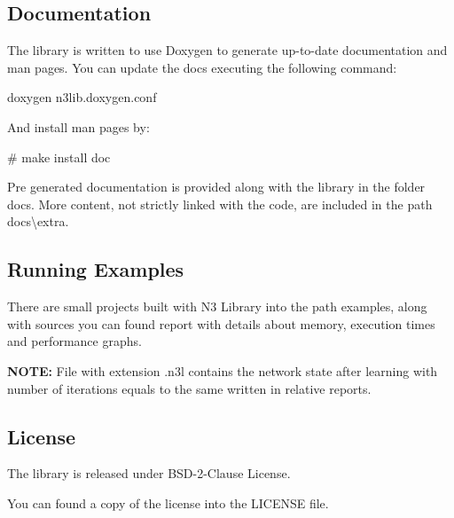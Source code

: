\subsection*{Documentation}

The library is written to use Doxygen to generate up-\/to-\/date documentation and man pages. You can update the docs executing the following command\+:


\begin{DoxyCode}
doxygen n3lib.doxygen.conf
\end{DoxyCode}


And install man pages by\+:


\begin{DoxyCode}
# make install doc
\end{DoxyCode}


Pre generated documentation is provided along with the library in the folder {\ttfamily docs}. More content, not strictly linked with the code, are included in the path {\ttfamily docs\textbackslash{}extra}.

\subsection*{Running Examples}

There are small projects built with N3 Library into the path {\ttfamily examples}, along with sources you can found report with details about memory, execution times and performance graphs.

{\bfseries N\+O\+TE\+:} File with extension {\ttfamily .n3l} contains the network state after learning with number of iterations equals to the same written in relative reports.

\subsection*{License}

The library is released under B\+S\+D-\/2-\/\+Clause License.

You can found a copy of the license into the {\ttfamily L\+I\+C\+E\+N\+SE} file. 
